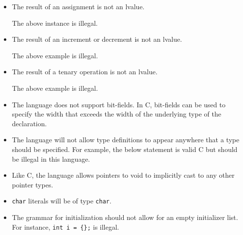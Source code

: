 \documentclass[12pt,english]{article}
\begin{document}
\begin{itemize}
\item
  The result of an assignment is not an lvalue.

\begin{Shaded}
\begin{Highlighting}[]
\NormalTok{) = }\NormalTok{;}
\end{Highlighting}
\end{Shaded}

  The above instance is illegal.
\item
  The result of an increment or decrement is not an lvalue.

\begin{Shaded}
\begin{Highlighting}[]
    \NormalTok{;}
\NormalTok{;}
\end{Highlighting}
\end{Shaded}

  The above example is illegal.
\item
  The result of a tenary operation is not an lvalue.

\begin{Shaded}
\begin{Highlighting}[]
    \NormalTok{;}
    \NormalTok{;}
\end{Highlighting}
\end{Shaded}

  The above example is illegal.
\item
  The language does not support bit-fields. In C, bit-fields can be used
  to specify the width that exceeds the width of the underlying type of
  the declaration.
\item
  The language will not allow type definitions to appear anywhere that a
  type should be specified. For example, the below statement is valid C
  but should be illegal in this language.

\begin{Shaded}
\begin{Highlighting}[]
\end{Highlighting}
\end{Shaded}
\item
  Like C, the language allows pointers to void to implicitly cast to any
  other pointer types.
\item
  \texttt{char} literals will be of type \texttt{char}.
\item
  The grammar for initialization should not allow for an empty
  initializer list. For instance, \texttt{int\ i\ =\ \{\};} is illegal.


\end{itemize}
\end{document}
